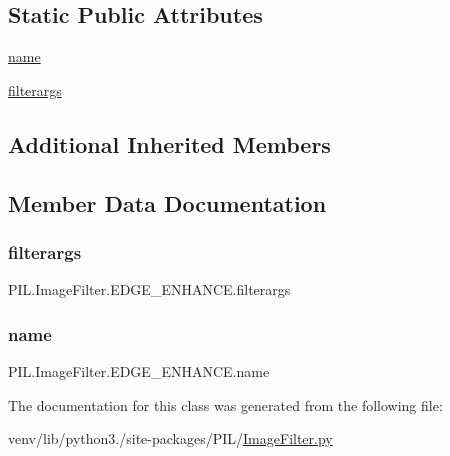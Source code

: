 \subsection*{Static Public Attributes}
\begin{DoxyCompactItemize}
\item 
\hyperlink{classPIL_1_1ImageFilter_1_1EDGE__ENHANCE_a5820e2a0f4118adeadc7252f9c0b530b}{name}
\item 
\hyperlink{classPIL_1_1ImageFilter_1_1EDGE__ENHANCE_ae3a33fd08dbd21779fead2be296aab2f}{filterargs}
\end{DoxyCompactItemize}
\subsection*{Additional Inherited Members}


\subsection{Member Data Documentation}
\mbox{\label{classPIL_1_1ImageFilter_1_1EDGE__ENHANCE_ae3a33fd08dbd21779fead2be296aab2f}} 
\subsubsection{\texorpdfstring{filterargs}{filterargs}}
{\footnotesize\ttfamily P\+I\+L.\+Image\+Filter.\+E\+D\+G\+E\+\_\+\+E\+N\+H\+A\+N\+C\+E.\+filterargs\hspace{0.3cm}{\ttfamily [static]}}

\mbox{\label{classPIL_1_1ImageFilter_1_1EDGE__ENHANCE_a5820e2a0f4118adeadc7252f9c0b530b}} 
\subsubsection{\texorpdfstring{name}{name}}
{\footnotesize\ttfamily P\+I\+L.\+Image\+Filter.\+E\+D\+G\+E\+\_\+\+E\+N\+H\+A\+N\+C\+E.\+name\hspace{0.3cm}{\ttfamily [static]}}



The documentation for this class was generated from the following file\+:\begin{DoxyCompactItemize}
\item 
venv/lib/python3./site-\/packages/\+P\+I\+L/\hyperlink{ImageFilter_8py}{Image\+Filter.\+py}\end{DoxyCompactItemize}
